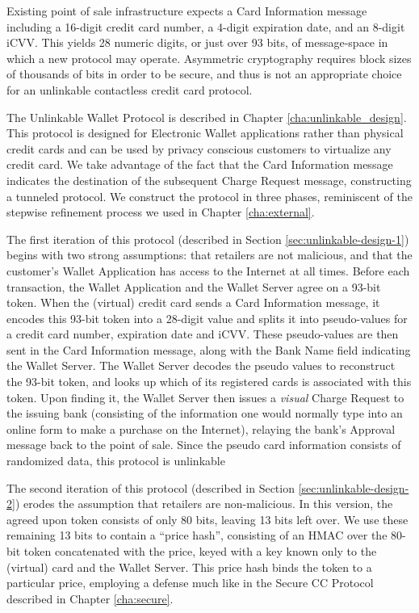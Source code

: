 Existing point of sale infrastructure expects a Card Information message including a 16-digit credit card number, a 4-digit expiration date, and an 8-digit iCVV.
This yields 28 numeric digits, or just over 93 bits, of message-space in which a new protocol may operate.
Asymmetric cryptography requires block sizes of thousands of bits in order to be secure, and thus is not an appropriate choice for an unlinkable contactless credit card protocol.


The Unlinkable Wallet Protocol is described in Chapter \ref{cha:unlinkable_design}.
This protocol is designed for Electronic Wallet applications rather than physical credit cards and can be used by privacy conscious customers to virtualize any credit card.
We take advantage of the fact that the Card Information message indicates the destination of the subsequent Charge Request message, constructing a tunneled protocol.
We construct the protocol in three phases, reminiscent of the stepwise refinement process we used in Chapter \ref{cha:external}.

The first iteration of this protocol (described in Section \ref{sec:unlinkable-design-1}) begins with two strong assumptions:
    that retailers are not malicious, and that the customer's Wallet Application has access to the Internet at all times.
Before each transaction, the Wallet Application and the Wallet Server agree on a 93-bit token.
When the (virtual) credit card sends a Card Information message, it encodes this 93-bit token into a 28-digit value and splits it into pseudo-values for a credit card number, expiration date and iCVV.
These pseudo-values are then sent in the Card Information message, along with the Bank Name field indicating the Wallet Server.
The Wallet Server decodes the pseudo values to reconstruct the 93-bit token, and looks up which of its registered cards is associated with this token.
Upon finding it, the Wallet Server then issues a \emph{visual} Charge Request to the issuing bank
    (consisting of the information one would normally type into an online form to make a purchase on the Internet),
    relaying the bank's Approval message back to the point of sale.
Since the pseudo card information consists of randomized data, this protocol is unlinkable

The second iteration of this protocol (described in Section \ref{sec:unlinkable-design-2}) erodes the assumption that retailers are non-malicious.
In this version, the agreed upon token consists of only 80 bits, leaving 13 bits left over.
We use these remaining 13 bits to contain a ``price hash'',
    consisting of an HMAC over the 80-bit token concatenated with the price, keyed with a key known only to the (virtual) card and the Wallet Server.
This price hash binds the token to a particular price, employing a defense much like in the Secure CC Protocol described in Chapter \ref{cha:secure}.


